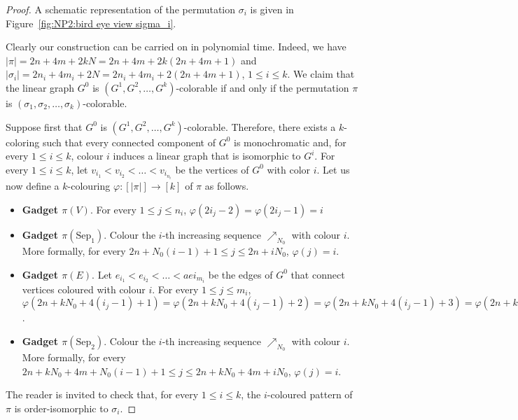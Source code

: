 \begin{proof}
  

  A schematic representation of the permutation $\sigma_i$ is given in
  Figure~\ref{fig:NP2:bird eye view sigma_i}.

  Clearly our construction can be carried on in polynomial time.
  Indeed, we have
  $|\pi| = 2n + 4m + 2kN = 2n + 4m + 2k(2n+4m+1)$
  and
  $|\sigma_i| = 2n_i + 4m_i + 2N = 2n_i + 4m_i + 2(2n+4m+1)$,
  $1 \leq i \leq k$.
  We claim that the linear graph $G^0$ is
  $(G^1, G^2, \dots, G^k)$-colorable
  if and only if the permutation
  $\pi$ is $(\sigma_1, \sigma_2, \dots, \sigma_k)$-colorable.

  Suppose first that $G^0$ is $(G^1, G^2, \dots, G^k)$-colorable.
  Therefore, there exists a $k$-coloring such that
  every connected component of $G^0$ is monochromatic and,
  for every $1 \leq i \leq k$, colour $i$ induces a linear graph that is
  isomorphic to $G^i$.
  For every $1 \leq i \leq k$,
  let $v_{i_1}< v_{i_2} < \dots < v_{i_{n_i}}$ be the vertices of $G^0$ with color $i$.
  Let us now define a $k$-colouring $\varphi: [|\pi|] \to [k]$ of $\pi$ as follows.
  \begin{itemize}
    \item \textbf{Gadget $\pi(V)$}.
    For every $1 \leq j \leq n_i$,
    $\varphi(2i_j-2) = \varphi(2i_j-1) = i$
    \item \textbf{Gadget $\pi(\text{Sep}_1)$}.
    Colour the $i$-th increasing sequence $\nearrow_{N_0}$ with colour $i$.
    More formally,
    for every $2n + N_0(i-1) + 1 \leq j \leq 2n + iN_0$,
    $\varphi(j) = i$.
    \item \textbf{Gadget $\pi(E)$}.
    Let $e_{i_1} < e_{i_2} < \ldots < ae{i_{m_i}}$ be the edges of $G^0$ that connect
    vertices coloured with colour $i$.
    For every $1 \leq j \leq m_i$,
    $\varphi(2n + kN_0 + 4(i_j-1) + 1) = \varphi(2n + kN_0 + 4(i_j-1) + 2) =
    \varphi(2n + kN_0 + 4(i_j-1) + 3) = \varphi(2n + kN_0 + 4(i_j-1) + 4) = i$.
    \item \textbf{Gadget $\pi(\text{Sep}_2)$}.
    Colour the $i$-th increasing sequence $\nearrow_{N_0}$ with colour $i$.
    More formally,
    for every $2n + kN_0 + 4m + N_0(i-1) + 1 \leq j \leq 2n + kN_0 + 4m + iN_0$,
    $\varphi(j) = i$.
  \end{itemize}
  The reader is invited to check that, for every $1 \leq i \leq k$,
  the $i$-coloured pattern of $\pi$ is order-isomorphic to $\sigma_i$.


\end{proof}
